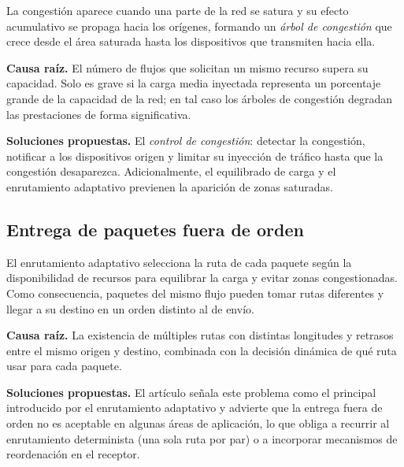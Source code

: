 \documentclass[12pt,a4paper]{article}
\begin{document}
La congestión aparece cuando una parte de la red se satura y su efecto acumulativo se propaga hacia los orígenes, formando un \emph{árbol de congestión} que crece desde el área saturada hasta los dispositivos que transmiten hacia ella.

\textbf{Causa raíz.} El número de flujos que solicitan un mismo recurso supera su capacidad. Solo es grave si la carga media inyectada representa un porcentaje grande de la capacidad de la red; en tal caso los árboles de congestión degradan las prestaciones de forma significativa.

\textbf{Soluciones propuestas.} El \emph{control de congestión}: detectar la congestión, notificar a los dispositivos origen y limitar su inyección de tráfico hasta que la congestión desaparezca. Adicionalmente, el equilibrado de carga y el enrutamiento adaptativo previenen la aparición de zonas saturadas.

\begin{center}
\end{center}

\subsection{Entrega de paquetes fuera de orden}

El enrutamiento adaptativo selecciona la ruta de cada paquete según la disponibilidad de recursos para equilibrar la carga y evitar zonas congestionadas. Como consecuencia, paquetes del mismo flujo pueden tomar rutas diferentes y llegar a su destino en un orden distinto al de envío.

\textbf{Causa raíz.} La existencia de múltiples rutas con distintas longitudes y retrasos entre el mismo origen y destino, combinada con la decisión dinámica de qué ruta usar para cada paquete.

\textbf{Soluciones propuestas.} El artículo señala este problema como el principal introducido por el enrutamiento adaptativo y advierte que la entrega fuera de orden no es aceptable en algunas áreas de aplicación, lo que obliga a recurrir al enrutamiento determinista (una sola ruta por par) o a incorporar mecanismos de reordenación en el receptor.
\end{document}
